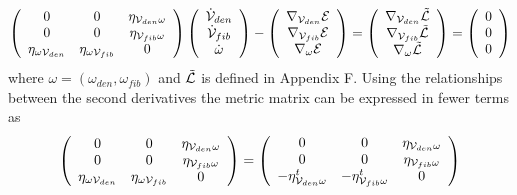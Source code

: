 \begin{equation}
\left( 
\begin{array}{ccc}
0 & 0 & \eta _{{\cal V}_{den}\omega } \\ 
0 & 0 & \eta _{{\cal V}_{fib}\omega } \\ 
\eta _{\omega {\cal V}_{den}} & \eta _{\omega {\cal V}_{fib}} & 0%
\end{array}%
\right) \left( 
\begin{array}{c}
{\cal \dot{V}}_{den} \\ 
{\cal \dot{V}}_{fib} \\ 
\dot{\omega}%
\end{array}%
\right) -\left( 
\begin{array}{c}
\nabla _{{\cal V}_{den}}{\cal E} \\ 
\nabla _{{\cal V}_{fib}}{\cal E} \\ 
\nabla _{\omega }{\cal E}%
\end{array}%
\right) =\left( 
\begin{array}{c}
\nabla _{{\cal V}_{den}}{\cal \tilde{L}} \\ 
\nabla _{{\cal V}_{fib}}{\cal \tilde{L}} \\ 
\nabla _{\omega }{\cal \tilde{L}}%
\end{array}%
\right) =\left( 
\begin{array}{c}
0 \\ 
0 \\ 
0%
\end{array}%
\right)  \label{FullEOM}
\end{equation}%
where $\omega =\left( \omega _{den},\omega _{fib}\right) $ and ${\cal \tilde{%
L}}$ is defined in Appendix F. Using the relationships between the second
derivatives the metric matrix can be expressed in fewer terms as 
\begin{equation}
\left( 
\begin{array}{ccc}
0 & 0 & \eta _{{\cal V}_{den}\omega } \\ 
0 & 0 & \eta _{{\cal V}_{fib}\omega } \\ 
\eta _{\omega {\cal V}_{den}} & \eta _{\omega {\cal V}_{fib}} & 0%
\end{array}%
\right) =\left( 
\begin{array}{ccc}
0 & 0 & \eta _{{\cal V}_{den}\omega } \\ 
0 & 0 & \eta _{{\cal V}_{fib}\omega } \\ 
-\eta _{{\cal V}_{den}\omega }^{t} & -\eta _{{\cal V}_{fib}\omega }^{t} & 0%
\end{array}%
\right)  \label{EOMVW}
\end{equation}%
